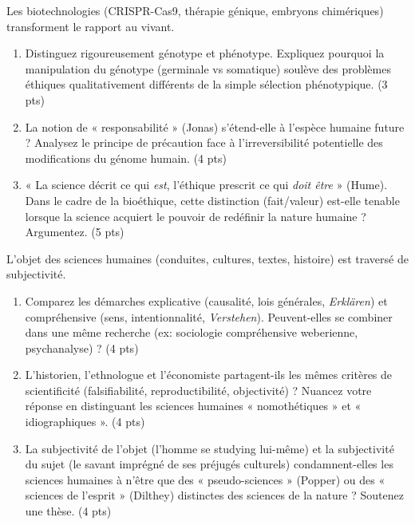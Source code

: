 \documentclass[11pt]{article}
\begin{document}
\begin{exercice}
Les biotechnologies (CRISPR-Cas9, thérapie génique, embryons chimériques) transforment le rapport au vivant.
\begin{enumerate}
    \item Distinguez rigoureusement génotype et phénotype. Expliquez pourquoi la manipulation du génotype (germinale vs somatique) soulève des problèmes éthiques qualitativement différents de la simple sélection phénotypique. (3 pts)
    \item La notion de « responsabilité » (Jonas) s'étend-elle à l'espèce humaine future ? Analysez le principe de précaution face à l'irreversibilité potentielle des modifications du génome humain. (4 pts)
    \item « La science décrit ce qui \textit{est}, l'éthique prescrit ce qui \textit{doit être} » (Hume). Dans le cadre de la bioéthique, cette distinction (fait/valeur) est-elle tenable lorsque la science acquiert le pouvoir de redéfinir la nature humaine ? Argumentez. (5 pts)
\end{enumerate}
\end{exercice}

\begin{exercice}
L'objet des sciences humaines (conduites, cultures, textes, histoire) est traversé de subjectivité.
\begin{enumerate}
    \item Comparez les démarches explicative (causalité, lois générales, \textit{Erklären}) et compréhensive (sens, intentionnalité, \textit{Verstehen}). Peuvent-elles se combiner dans une même recherche (ex: sociologie compréhensive weberienne, psychanalyse) ? (4 pts)
    \item L'historien, l'ethnologue et l'économiste partagent-ils les mêmes critères de scientificité (falsifiabilité, reproductibilité, objectivité) ? Nuancez votre réponse en distinguant les sciences humaines « nomothétiques » et « idiographiques ». (4 pts)
    \item La subjectivité de l'objet (l'homme se studying lui-même) et la subjectivité du sujet (le savant imprégné de ses préjugés culturels) condamnent-elles les sciences humaines à n'être que des « pseudo-sciences » (Popper) ou des « sciences de l'esprit » (Dilthey) distinctes des sciences de la nature ? Soutenez une thèse. (4 pts)
\end{enumerate}
\end{exercice}
\end{document}
